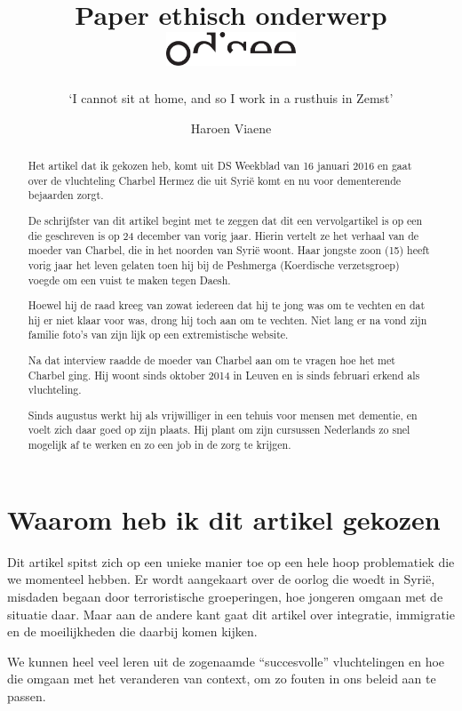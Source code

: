 \documentclass[12pt, a4paper]{paper}
\title{
\vspace{-2cm}
Paper ethisch onderwerp\\
\vspace{-1cm}
\hfill\includegraphics[height=1cm]{logo.pdf}}
\subtitle{`I cannot sit at home, and so I work in a rusthuis in Zemst'
\vspace{-.5cm}}
\author{
\vspace{-1cm}
\begin{large}
  Haroen Viaene
\end{large}
\vspace{-1cm}
}
\begin{document}
\maketitle

\begin{abstract}

Het artikel dat ik gekozen heb, komt uit DS Weekblad van 16 januari 2016 en gaat over de vluchteling Charbel Hermez die uit Syrië komt en nu voor dementerende bejaarden zorgt.

De schrijfster van dit artikel begint met te zeggen dat dit een vervolgartikel is op een die geschreven is op 24 december van vorig jaar. Hierin vertelt ze het verhaal van de moeder van Charbel, die in het noorden van Syrië woont. Haar jongste zoon (15) heeft vorig jaar het leven gelaten toen hij bij de Peshmerga (Koerdische verzetsgroep) voegde om een vuist te maken tegen Daesh.

Hoewel hij de raad kreeg van zowat iedereen dat hij te jong was om te vechten en dat hij er niet klaar voor was, drong hij toch aan om te vechten. Niet lang er na vond zijn familie foto's van zijn lijk op een extremistische website.

Na dat interview raadde de moeder van Charbel aan om te vragen hoe het met Charbel ging. Hij woont sinds oktober 2014 in Leuven en is sinds februari erkend als vluchteling.

Sinds augustus werkt hij als vrijwilliger in een tehuis voor mensen met dementie, en voelt zich daar goed op zijn plaats. Hij plant om zijn cursussen Nederlands zo snel mogelijk af te werken en zo een job in de zorg te krijgen.


\end{abstract}

\section{Waarom heb ik dit artikel gekozen}

Dit artikel spitst zich op een unieke manier toe op een hele hoop problematiek die we momenteel hebben. Er wordt aangekaart over de oorlog die woedt in Syrië, misdaden begaan door terroristische groeperingen, hoe jongeren omgaan met de situatie daar. Maar aan de andere kant gaat dit artikel over integratie, immigratie en de moeilijkheden die daarbij komen kijken.

We kunnen heel veel leren uit de zogenaamde ``succesvolle'' vluchtelingen en hoe die omgaan met het veranderen van context, om zo fouten in ons beleid aan te passen.
\end{document}
